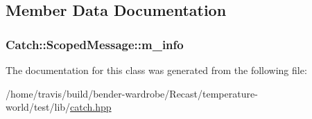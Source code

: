 \subsection{Member Data Documentation}
\hypertarget{class_catch_1_1_scoped_message_ae6e1476f389cc6e1586f033b3747b27b}{
\subsubsection[{m\-\_\-info}]{ Catch\-::\-Scoped\-Message\-::m\-\_\-info}}\label{class_catch_1_1_scoped_message_ae6e1476f389cc6e1586f033b3747b27b}


The documentation for this class was generated from the following file\-:\begin{DoxyCompactItemize}
\item 
/home/travis/build/bender-\/wardrobe/\-Recast/temperature-\/world/test/lib/\hyperlink{catch_8hpp}{catch.\-hpp}\end{DoxyCompactItemize}
